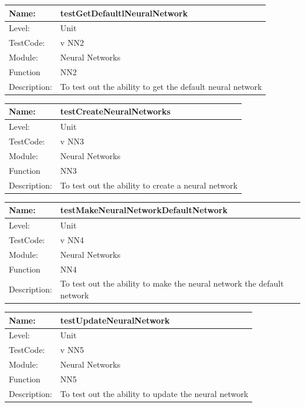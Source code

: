 \documentclass[12pt]{article}
\begin{document}
\begin{center}
\begin{tabular}{|l|p{12cm}|}
\hline

 Name: & testGetDefaultlNeuralNetwork \\
 \hline
Level: & Unit \\
\hline
TestCode: & v NN2 \\
\hline
Module:& Neural Networks \\
\hline
Function & NN2 \\
\hline
Description: & To test out the ability to get the default neural network  \\
\hline
\end{tabular}
\end{center}
\begin{center}
\begin{tabular}{|l|p{12cm}|}
\hline

 Name: & testCreateNeuralNetworks \\
 \hline
Level: & Unit \\
\hline
TestCode: & v NN3 \\
\hline
Module:& Neural Networks \\
\hline
Function & NN3 \\
\hline
Description: & To test out the ability to create a neural network  \\
\hline
\end{tabular}
\end{center}

\begin{center}
\begin{tabular}{|l|p{12cm}|}
\hline

 Name: & testMakeNeuralNetworkDefaultNetwork \\
 \hline
Level: & Unit \\
\hline
TestCode: & v NN4 \\
\hline
Module:& Neural Networks \\
\hline
Function & NN4 \\
\hline
Description: & To test out the ability to make the neural network the default network  \\
\hline
\end{tabular}
\end{center}

\begin{center}
\begin{tabular}{|l|p{12cm}|}
\hline

 Name: & testUpdateNeuralNetwork \\
 \hline
Level: & Unit \\
\hline
TestCode: & v NN5 \\
\hline
Module:& Neural Networks \\
\hline
Function & NN5 \\
\hline
Description: & To test out the ability to update the neural network  \\
\hline
\end{tabular}
\end{center}
\end{document}
